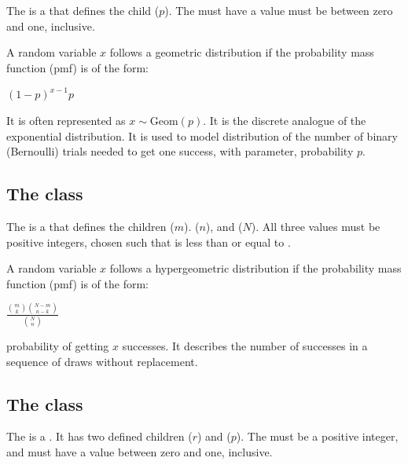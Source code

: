 The \GeometricDistribution is a \DiscreteUnivariateDistribution that defines the \UncertValue child  ($p$).  The  must have a value must be between zero and one, inclusive.

A random variable $ x $ follows a geometric distribution if the probability mass function (pmf) is of the form:

\begin{center}
$(1-p)^{x-1} p$
\end{center}

It is often represented as $x \sim \mathrm{Geom}(p)$. It is the discrete analogue of the exponential distribution. It is used to model distribution of the number of binary (Bernoulli) trials needed to get one success, with parameter, probability $p$.

\subsection{The  class}
\label{HypergeometricDistribution-class}
\label{hypergeometricdistribution-class}

The \HypergeometricDistribution is a \DiscreteUnivariateDistribution that defines the \UncertValue children  ($m$).  ($n$), and  ($N$).  All three values must be positive integers, chosen such that  is less than or equal to .

A random variable $ x $ follows a hypergeometric distribution if the probability mass function (pmf) is of the form:

\begin{center}
$\frac{ {m \choose k} { N-m \choose n-k } } { {N \choose n}}$
\end{center}

probability of getting $x$ successes.  It describes the number of successes in a sequence of draws without replacement.

\subsection{The  class}
\label{NegativeBinomialDistribution-class}
\label{negativebinomialdistribution-class}

The \NegativeBinomialDistribution is a \DiscreteUnivariateDistribution.  It has two defined \UncertValue children  ($r$) and  ($p$). The  must be a positive integer, and  must have a value between zero and one, inclusive.

